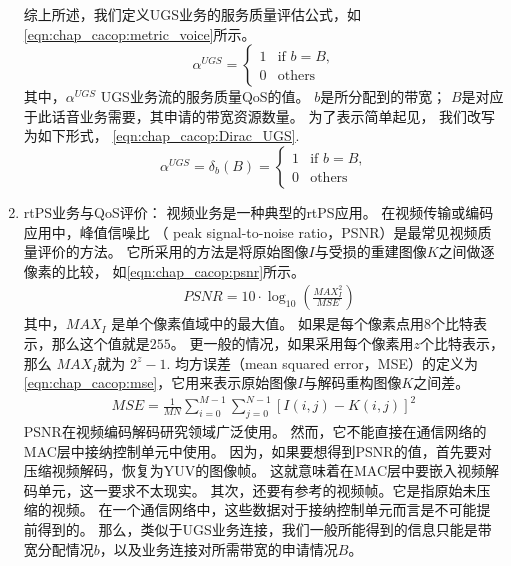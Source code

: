 \begin{enumerate}[(1)]
综上所述，我们定义UGS业务的服务质量评估公式，如\eqref{eqn:chap_cacop:metric_voice}所示。
\begin{equation}
\label{eqn:chap_cacop:metric_voice}
\alpha^{UGS}=
\begin{cases}
1 & \text{if $b=B$,}\\
0 &\text{others}
\end{cases}
\end{equation}
其中，$\alpha^{UGS}$ UGS业务流的服务质量QoS的值。
$b$是所分配到的带宽；
$B$是对应于此话音业务需要，其申请的带宽资源数量。
为了表示简单起见，
我们改写为如下形式，
\eqref{eqn:chap_cacop:Dirac_UGS}.
%
\begin{equation}
\label{eqn:chap_cacop:Dirac_UGS}
\alpha^{UGS}= \delta_{b}(B) = 
\begin{cases}
1 & \text{if $b= B$,}\\
0 &\text{others}
\end{cases}
\end{equation}
\item rtPS业务与QoS评价： 
视频业务是一种典型的rtPS应用。
在视频传输或编码应用中，峰值信噪比 （ peak signal-to-noise ratio，PSNR）是最常见视频质量评价的方法。
它所采用的方法是将原始图像$I$与受损的重建图像$K$之间做逐像素的比较，
如\eqref{eqn:chap_cacop:psnr}所示。 
%
\begin{align}
\label{eqn:chap_cacop:psnr}
& PSNR = 10 \cdot \log_{10} \left( \frac{MAX_I^2}{MSE} \right)
\end{align}
其中，$MAX_I$ 是单个像素值域中的最大值。
如果是每个像素点用$8$个比特表示，那么这个值就是$255$。
更一般的情况，如果采用每个像素用$z$个比特表示，那么 $MAX_I$就为 $2^z - 1$. 均方误差（mean squared error，MSE）的定义为\eqref{eqn:chap_cacop:mse}，它用来表示原始图像$I$与解码重构图像$K$之间差。
\begin{align}
\label{eqn:chap_cacop:mse}
MSE = \frac{1}{MN} \sum_{i=0}^{M-1}\sum_{j=0}^{N-1} \left[I(i,j) - K(i,j)\right]^2 
\end{align}
PSNR在视频编码解码研究领域广泛使用。
然而，它不能直接在通信网络的MAC层中接纳控制单元中使用。
因为，如果要想得到PSNR的值，首先要对压缩视频解码，恢复为YUV的图像帧。
这就意味着在MAC层中要嵌入视频解码单元，这一要求不太现实。
其次，还要有参考的视频帧。它是指原始未压缩的视频。
在一个通信网络中，这些数据对于接纳控制单元而言是不可能提前得到的。
那么，类似于UGS业务连接，我们一般所能得到的信息只能是带宽分配情况$b$，以及业务连接对所需带宽的申请情况$B$。


\end{enumerate}
